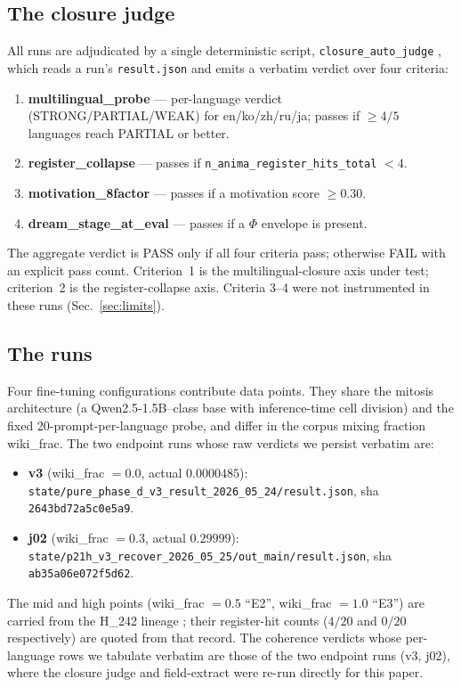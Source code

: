 \documentclass[11pt,a4paper]{article}
\begin{document}
\subsection{The closure judge}

All runs are adjudicated by a single deterministic script,
\verb|closure_auto_judge| \citep{anima2026closurejudge}, which reads a
run's \verb|result.json| and emits a verbatim verdict over four criteria:
\begin{enumerate}\itemsep0.2em
\item \textbf{multilingual\_probe} --- per-language verdict
  (STRONG/PARTIAL/WEAK) for en/ko/zh/ru/ja; passes if $\geq 4/5$ languages
  reach PARTIAL or better.
\item \textbf{register\_collapse} --- passes if
  \verb|n_anima_register_hits_total| $< 4$.
\item \textbf{motivation\_8factor} --- passes if a motivation score
  $\geq 0.30$.
\item \textbf{dream\_stage\_at\_eval} --- passes if a $\Phi$ envelope is
  present.
\end{enumerate}
The aggregate verdict is PASS only if all four criteria pass; otherwise
FAIL with an explicit pass count. Criterion~1 is the multilingual-closure
axis under test; criterion~2 is the register-collapse axis. Criteria 3--4
were not instrumented in these runs (Sec.~\ref{sec:limits}).

\subsection{The runs}

Four fine-tuning configurations contribute data points. They share the
mitosis architecture (a Qwen2.5-1.5B--class base with inference-time cell
division) and the fixed 20-prompt-per-language probe, and differ in the
corpus mixing fraction wiki\_frac. The two endpoint runs whose raw verdicts
we persist verbatim are:
\begin{itemize}\itemsep0.2em
\item \textbf{v3} (wiki\_frac $=0.0$, actual $0.0000485$):
  \verb|state/pure_phase_d_v3_result_2026_05_24/result.json|, sha
  \verb|2643bd72a5c0e5a9|.
\item \textbf{j02} (wiki\_frac $=0.3$, actual $0.29999$):
  \verb|state/p21h_v3_recover_2026_05_25/out_main/result.json|, sha
  \verb|ab35a06e072f5d62|.
\end{itemize}
The mid and high points (wiki\_frac $=0.5$ ``E2'', wiki\_frac $=1.0$
``E3'') are carried from the H\_242 lineage \citep{anima2026h242}; their
register-hit counts ($4/20$ and $0/20$ respectively) are quoted from that
record. The coherence verdicts whose per-language rows we tabulate
verbatim are those of the two endpoint runs (v3, j02), where the closure
judge and field-extract were re-run directly for this paper.
\end{document}
